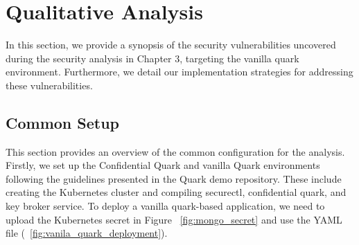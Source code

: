 \section{Qualitative Analysis}
In this section, we provide a synopsis of the security vulnerabilities uncovered during the security analysis in Chapter 3, targeting the vanilla quark environment. Furthermore, we detail our implementation strategies for addressing these vulnerabilities.

\subsection{Common Setup}

This section provides an overview of the common configuration for the analysis. Firstly, we set up the Confidential Quark and vanilla Quark environments following the guidelines presented in the Quark demo repository. These include creating the Kubernetes cluster and compiling securectl, 
confidential quark, and key broker service. To deploy a vanilla quark-based application, we need to upload the Kubernetes secret in Figure ~\ref{fig:mongo_secret} and use the YAML file (~\ref{fig:vanila_quark_deployment}). 



